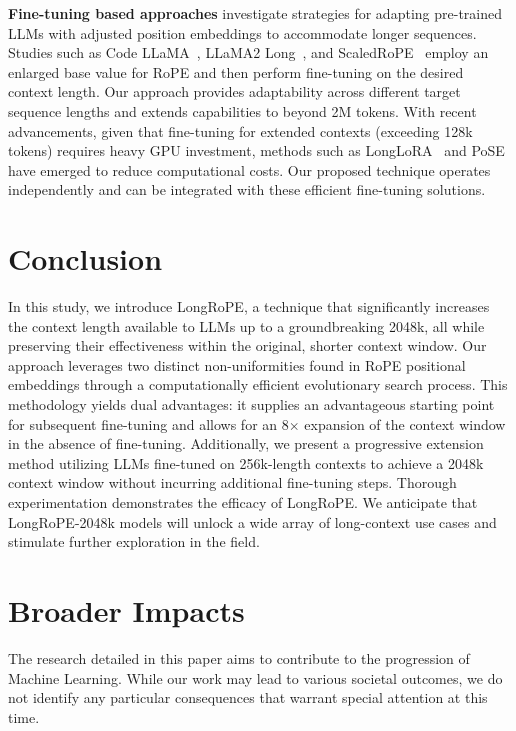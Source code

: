 \textbf{Fine-tuning based approaches} investigate strategies for adapting pre-trained LLMs with adjusted position embeddings to accommodate longer sequences. Studies such as Code LLaMA~\cite{codellama}, LLaMA2 Long~\cite{xiong2023effective}, and ScaledRoPE~\cite{liu2023scaling} employ an enlarged base value for RoPE and then perform fine-tuning on the desired context length. Our approach provides adaptability across different target sequence lengths and extends capabilities to beyond 2M tokens. With recent advancements, given that fine-tuning for extended contexts (exceeding 128k tokens) requires heavy GPU investment, methods such as LongLoRA~\cite{longlora} and PoSE~\cite{zhu2023pose} have emerged to reduce computational costs. Our proposed technique operates independently and can be integrated with these efficient fine-tuning solutions.

\section{Conclusion}

In this study, we introduce LongRoPE, a technique that significantly increases the context length available to LLMs up to a groundbreaking 2048k, all while preserving their effectiveness within the original, shorter context window. Our approach leverages two distinct non-uniformities found in RoPE positional embeddings through a computationally efficient evolutionary search process. This methodology yields dual advantages: it supplies an advantageous starting point for subsequent fine-tuning and allows for an 8$\times$ expansion of the context window in the absence of fine-tuning. Additionally, we present a progressive extension method utilizing LLMs fine-tuned on 256k-length contexts to achieve a 2048k context window without incurring additional fine-tuning steps. Thorough experimentation demonstrates the efficacy of LongRoPE. We anticipate that LongRoPE-2048k models will unlock a wide array of long-context use cases and stimulate further exploration in the field.

\section*{Broader Impacts} The research detailed in this paper aims to contribute to the progression of Machine Learning. While our work may lead to various societal outcomes, we do not identify any particular consequences that warrant special attention at this time.

	\balance

